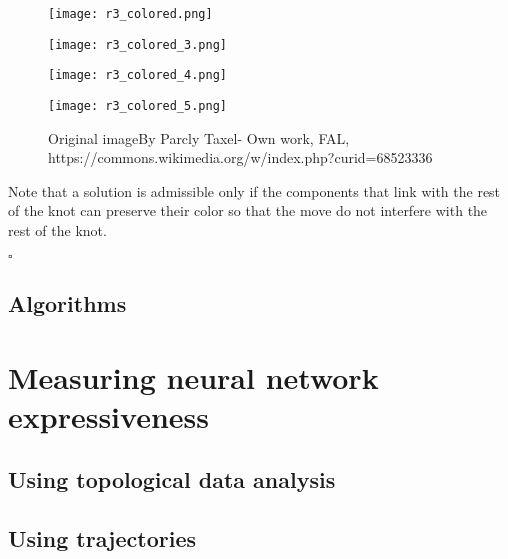 \documentclass[12pt, a4paper]{article}
\newenvironment{proof}{{\sc Proof:}}{\hfill $\square$}
\begin{document}
\begin{proof}
\begin{itemize}
\begin{figure}[H]
\begin{minipage}[c]{.3\textwidth}
  \end{minipage}
  \begin{minipage}[c]{.3\textwidth}
             \centering
            \texttt{[image: r3\_colored.png]}
    
  \end{minipage}
  \begin{minipage}[c]{.3\textwidth}
             \centering
            \texttt{[image: r3\_colored\_3.png]}
    
  \end{minipage}
  \begin{minipage}[c]{.5\textwidth}
             \centering
            \texttt{[image: r3\_colored\_4.png]}
    
  \end{minipage}
  \begin{minipage}[c]{.5\textwidth}
             \centering
            \texttt{[image: r3\_colored\_5.png]}
    
  \end{minipage}
          \caption{Original imageBy Parcly Taxel- Own work, FAL, https://commons.wikimedia.org/w/index.php?curid=68523336}
        \label{fig:r_3_colored}
\end{figure}
\end{itemize}

Note that a solution is admissible only if the components that link with the rest of the knot can preserve their color so that the move do not interfere with the rest of the knot.

\end{proof}

\subsection{Algorithms}

\newpage
\thispagestyle{empty}
\mbox{}
\newpage

\section{Measuring neural network expressiveness}

\subsection{Using topological data analysis}

\subsection{Using trajectories}
\end{document}
